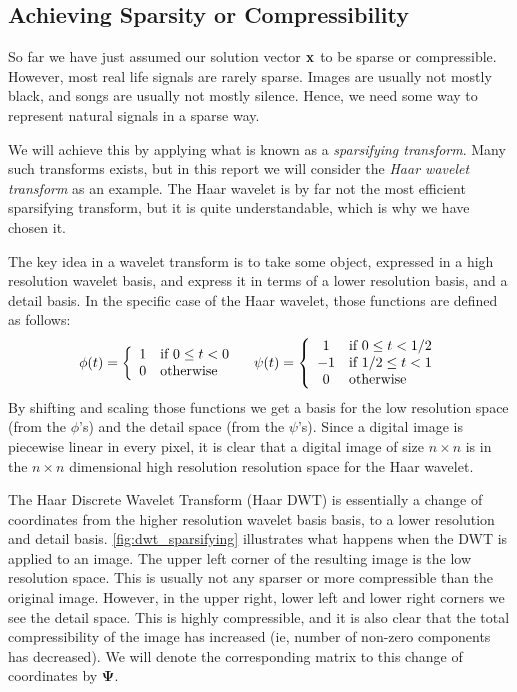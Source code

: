 \subsection{Achieving Sparsity or Compressibility}
So far we have just assumed our solution vector $ \mathbf{x} $ to be sparse or compressible. However, most real life signals are rarely sparse. Images are usually not mostly black, and songs are usually not mostly silence. Hence, we need some way to represent natural signals in a sparse way. 

We will achieve this by applying what is known as a \textit{sparsifying transform}. Many such transforms exists, but in this report we will consider the \textit{Haar wavelet transform} as an example. The Haar wavelet is by far not the most efficient sparsifying transform, but it is quite understandable, which is why we have chosen it. 

The key idea in a wavelet transform is to take some object, expressed in a high resolution wavelet basis, and express it in terms of a lower resolution basis, and a detail basis. In the specific case of the Haar wavelet, those functions are defined as follows:
\[
	\phi(t) = \left\{ \begin{array}{cl} 1 & \text{if } 0\leq t < 0 \\ 0 & \text{otherwise} \end{array} \right.
	\quad
	\psi(t) = \left\{ \begin{array}{cl} 1 & \text{if } 0\leq t < 1/2 \\ -1 & \text{if } 1/2 \leq t < 1 \\ 0 & \text{otherwise} \end{array} \right.
\]
By shifting and scaling those functions we get a basis for the low resolution space (from the $ \phi $'s) and the detail space (from the $ \psi $'s). Since a digital image is piecewise linear in every pixel, it is clear that a digital image of size $ n \times n $ is in the $ n \times n $ dimensional high resolution resolution space for the Haar wavelet.

The Haar Discrete Wavelet Transform (Haar DWT) is essentially a change of coordinates from the higher resolution wavelet basis basis, to a lower resolution and detail basis. \cref{fig:dwt_sparsifying} illustrates what happens when the DWT is applied to an image. The upper left corner of the resulting image is the low resolution space. This is usually not any sparser or more compressible than the original image. However, in the upper right, lower left and lower right corners we see the detail space. This is highly compressible, and it is also clear that the total compressibility of the image has increased (ie, number of non-zero components has decreased). We will denote the corresponding matrix to this change of coordinates by $ \mathbf{\Psi} $. 

